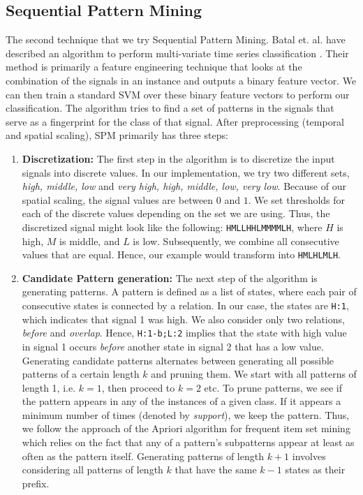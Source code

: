 \documentclass[twocolumn]{article}
\begin{document}
\subsection{Sequential Pattern Mining}
The second technique that we try Sequential Pattern Mining. Batal et. al. have described an algorithm to perform multi-variate time series classification \cite{batal2009multivariate}. Their method is primarily a feature engineering technique that looks at the combination of the signals in an instance and outputs a binary feature vector. We can then train a standard SVM over these binary feature vectors to perform our classification. The algorithm tries to find a set of patterns in the signals that serve as a fingerprint for the class of that signal. After preprocessing (temporal and spatial scaling), SPM primarily has three steps:
\begin{enumerate}
\item \textbf{Discretization:} The first step in the algorithm is to discretize the input signals into discrete values. In our implementation, we try two different sets, {\textit{high, middle, low}} and {\textit{very high, high, middle, low, very low}}. Because of our spatial scaling, the signal values are between $0$ and $1$. We set thresholds for each of the discrete values depending on the set we are using. Thus, the discretized signal might look like the following: \texttt{HMLLHHLMMMMLH}, where $H$ is high, $M$ is middle, and $L$ is low. Subsequently, we combine all consecutive values that are equal. Hence, our example would transform into \texttt{HMLHLMLH}.
\item \textbf{Candidate Pattern generation:} The next step of the algorithm is generating patterns. A pattern is defined as a list of states, where each pair of consecutive states is connected by a relation. In our case, the states are \texttt{H:1}, which indicates that signal 1 was high. We also consider only two relations, \textit{before} and \textit{overlap}. Hence, \texttt{H:1-b;L:2} implies that the state with high value in signal 1 occurs \textit{before} another state in signal 2 that has a low value. Generating candidate patterns alternates between generating all possible patterns of a certain length $k$ and pruning them. We start with all patterns of length 1, i.e. $k=1$, then proceed to $k=2$ etc. To prune patterns, we see if the pattern appears in any of the instances of a given class. If it appears a minimum number of times (denoted by \textit{support}), we keep the pattern. Thus, we follow the approach of the Apriori algorithm for frequent item set mining which relies on the fact that any of a pattern's subpatterns appear at least as often as the pattern itself. Generating patterns of length $k+1$ involves considering all patterns of length $k$ that have the same $k-1$ states as their prefix.

\end{enumerate}
\end{document}
